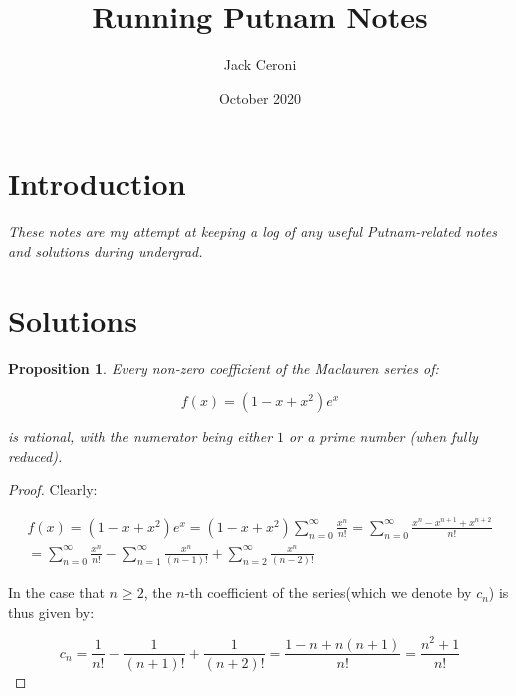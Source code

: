 \documentclass[10pt, oneside]{article}
\title{Running Putnam Notes}
\author{Jack Ceroni}
\date{October 2020}
\newtheorem{prop}{Proposition}
\begin{document}
    \maketitle
    \tableofcontents

    \vspace{.25in}

    
    \section{Introduction}

    \textit{These notes are my attempt at keeping a log of any useful Putnam-related notes and solutions during undergrad.}

    \section{Solutions}

    \begin{prop}
      Every non-zero coefficient of the Maclauren series of:

      $$f(x) = (1 - x + x^2) e^x$$

      is rational, with the numerator being either $1$ or a prime number (when fully reduced).
    \end{prop}

    \begin{proof}
      Clearly:

      \begin{equation}
        \begin{split}
        f(x) = (1 - x + x^2) e^x = (1 - x + x^2) \displaystyle\sum_{n = 0}^{\infty} \frac{x^n}{n!} = \displaystyle\sum_{n = 0}^{\infty} \frac{x^n - x^{n + 1} + x^{n + 2}}{n!} \\
         = \displaystyle\sum_{n = 0}^{\infty} \frac{x^n}{n!} - \displaystyle\sum_{n = 1}^{\infty} \frac{x^n}{(n - 1)!} + \displaystyle\sum_{n = 2}^{\infty} \frac{x^n}{(n - 2)!}
        \end{split}
      \end{equation}

      In the case that $n \geq 2$, the $n$-th coefficient of the series(which we denote by $c_n$) is thus given by:

      \begin{equation}
        c_n = \frac{1}{n!} - \frac{1}{(n + 1)!} + \frac{1}{(n + 2)!} = \frac{1 - n + n(n + 1)}{n!} = \frac{n^2 + 1}{n!}
        \end{equation}
    \end{proof}
    
    
\end{document}
